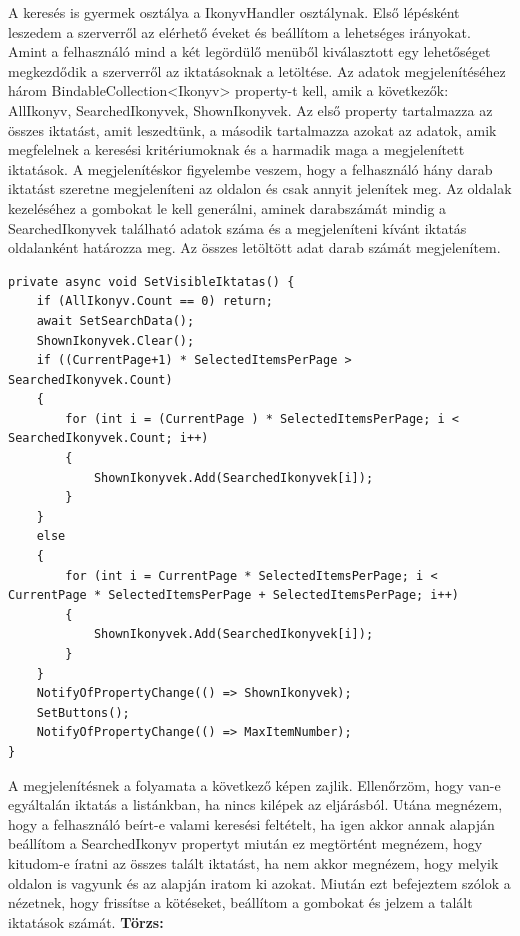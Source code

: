\documentclass[
]{thesis-ekf}
\theoremstyle{definition}
\theoremstyle{remark}
\begin{document}
A keresés is gyermek osztálya a IkonyvHandler osztálynak. Első lépésként leszedem a szerverről az elérhető éveket és beállítom a lehetséges irányokat. Amint a felhasználó mind a két legördülő menüből kiválasztott egy lehetőséget megkezdődik a szerverről az iktatásoknak a letöltése. Az adatok megjelenítéséhez három BindableCollection<Ikonyv> property-t kell, amik a következők: AllIkonyv, SearchedIkonyvek, ShownIkonyvek. Az első property tartalmazza az összes iktatást, amit leszedtünk, a második tartalmazza azokat az adatok, amik megfelelnek a keresési kritériumoknak és a harmadik maga a megjelenített iktatások. A megjelenítéskor figyelembe veszem, hogy a felhasználó hány darab iktatást szeretne megjeleníteni az oldalon és csak annyit jelenítek meg. Az oldalak kezeléséhez a gombokat le kell generálni, aminek darabszámát mindig a SearchedIkonyvek található adatok száma és a megjeleníteni kívánt iktatás oldalanként határozza meg. Az összes letöltött adat darab számát megjelenítem.
\begin{lstlisting}
private async void SetVisibleIktatas() {	
	if (AllIkonyv.Count == 0) return;
	await SetSearchData();
	ShownIkonyvek.Clear();
	if ((CurrentPage+1) * SelectedItemsPerPage > SearchedIkonyvek.Count)
	{
		for (int i = (CurrentPage ) * SelectedItemsPerPage; i < SearchedIkonyvek.Count; i++)
		{
			ShownIkonyvek.Add(SearchedIkonyvek[i]);
		}
	}
	else 
	{
		for (int i = CurrentPage * SelectedItemsPerPage; i < CurrentPage * SelectedItemsPerPage + SelectedItemsPerPage; i++)
		{
			ShownIkonyvek.Add(SearchedIkonyvek[i]);
		}
	}
	NotifyOfPropertyChange(() => ShownIkonyvek);	
	SetButtons();
	NotifyOfPropertyChange(() => MaxItemNumber);
} 
\end{lstlisting}

A megjelenítésnek a folyamata a következő képen zajlik. Ellenőrzöm, hogy van-e egyáltalán iktatás a listánkban, ha nincs kilépek az eljárásból. Utána megnézem, hogy a felhasználó beírt-e valami keresési feltételt, ha igen akkor annak alapján beállítom a SearchedIkonyv propertyt miután ez megtörtént megnézem, hogy kitudom-e íratni az összes talált iktatást, ha nem akkor megnézem, hogy melyik oldalon is vagyunk és az alapján iratom ki azokat. Miután ezt befejeztem szólok a nézetnek, hogy frissítse a kötéseket, beállítom a gombokat és jelzem a talált iktatások számát.
\textbf{Törzs:}
\end{document}
